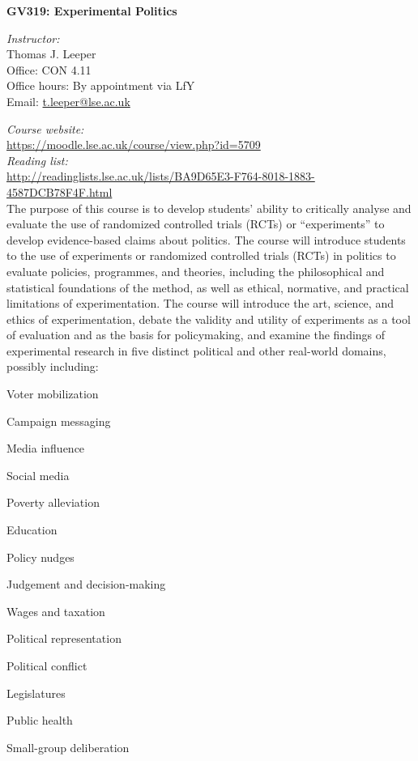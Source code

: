 \documentclass[12pt,a4paper]{article}
\begin{document}
\nobibliography*
\faketableofcontents

\begin{center}
{\Large
\noindent \textbf{GV319: Experimental Politics}
}
\end{center}
\vspace{1em}

\noindent
\textit{Instructor:}\\
Thomas J. Leeper\\
Office: CON 4.11\\
Office hours: By appointment via LfY\\
Email: \href{mailto:t.leeper@lse.ac.uk}{t.leeper@lse.ac.uk}

\vspace{1em}

\noindent \textit{Course website:}\\ \url{https://moodle.lse.ac.uk/course/view.php?id=5709} \\
\noindent \textit{Reading list:}\\ \url{http://readinglists.lse.ac.uk/lists/BA9D65E3-F764-8018-1883-4587DCB78F4F.html}\\

\noindent The purpose of this course is to develop students' ability to critically analyse and evaluate the use of randomized controlled trials (RCTs) or ``experiments'' to develop evidence-based claims about politics. The course will introduce students to the use of experiments or randomized controlled trials (RCTs) in politics to evaluate policies, programmes, and theories, including the philosophical and statistical foundations of the method, as well as ethical, normative, and practical limitations of experimentation. The course will introduce the art, science, and ethics of experimentation, debate the validity and utility of experiments as a tool of evaluation and as the basis for policymaking, and examine the findings of experimental research in five distinct political and other real-world domains, possibly including:

\begin{enumerate*}
\item Voter mobilization
\item Campaign messaging
\item Media influence
\item Social media
\item Poverty alleviation
\item Education
\item Policy nudges
\item Judgement and decision-making
\item Wages and taxation
\item Political representation
\item Political conflict
\item Legislatures
\item Public health
\item Small-group deliberation
\end{enumerate*}
\end{document}

